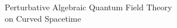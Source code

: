 \documentclass[9pt]{beamer}
\begin{document}

{%
%
%
%
\begin{frame}%
\bf
\vspace*{30pt}
%
\begin{exampleblock}{\vspace*{-3ex}}%
%
\begin{center}%
%
\Large Perturbative Algebraic Quantum Field Theory \\[10pt] on Curved Spacetime
%
\end{center}%
%
\end{exampleblock}%
%
\end{frame}
%
}%

\end{document}
